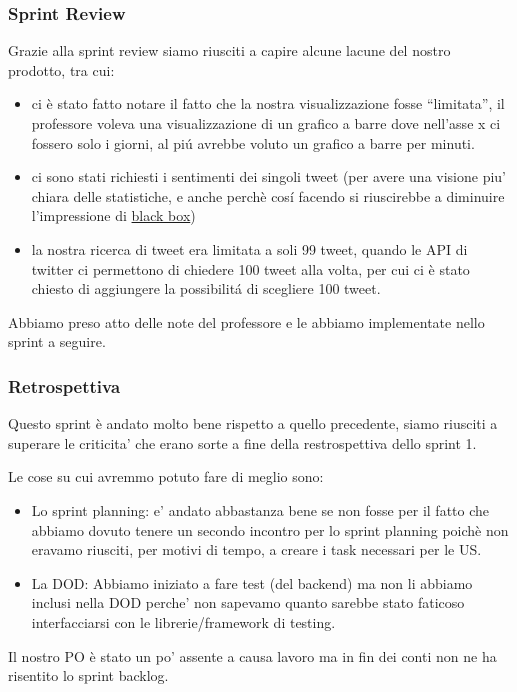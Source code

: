 \documentclass{article}
\begin{document}
\subsubsection{Sprint Review}
Grazie alla sprint review siamo riusciti a capire alcune lacune del nostro prodotto, tra cui:
\begin{itemize}
    \item ci \`e stato fatto notare il fatto che la nostra visualizzazione fosse “limitata”, il professore voleva una visualizzazione di un grafico a barre dove nell'asse x ci fossero solo i giorni, al pi\'u avrebbe voluto un grafico a barre per minuti.
    \item ci sono stati richiesti i sentimenti dei singoli tweet (per avere una visione piu' chiara delle statistiche, e anche perch\`e cos\'i facendo si riuscirebbe a diminuire l'impressione di \href{https://en.wikipedia.org/wiki/Black_box}{black box})
    \item la nostra ricerca di tweet era limitata a soli 99 tweet, quando le API di twitter ci permettono di chiedere 100 tweet alla volta, per cui ci \`e stato chiesto di aggiungere la possibilit\'a di scegliere 100 tweet.
\end{itemize}
Abbiamo preso atto delle note del professore e le abbiamo implementate nello sprint a seguire.
\subsubsection{Retrospettiva}
Questo sprint \`e andato molto bene rispetto a quello precedente, siamo riusciti a superare le criticita' che erano sorte a fine della restrospettiva dello sprint 1.

Le cose su cui avremmo potuto fare di meglio sono:
\begin{itemize}
\item Lo sprint planning: e' andato abbastanza bene se non fosse per il fatto che abbiamo dovuto tenere un secondo incontro per lo sprint planning poich\`e non eravamo riusciti, per motivi di tempo, a creare i task necessari per le US.
\item La DOD: Abbiamo iniziato a fare test (del backend) ma non li abbiamo inclusi nella DOD perche' non sapevamo quanto sarebbe stato faticoso interfacciarsi con le librerie/framework di testing.
\end{itemize}

Il nostro PO \`e stato un po' assente a causa lavoro ma in fin dei conti non ne ha risentito lo sprint backlog.
\end{document}
